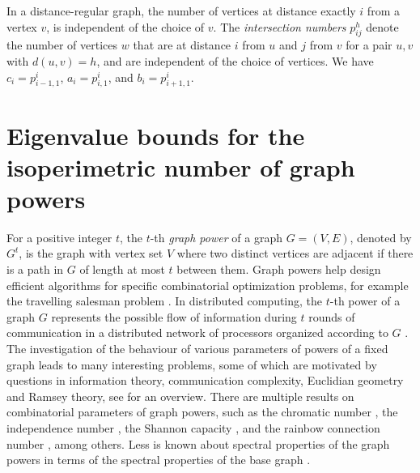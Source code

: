 \documentclass[a4paper,11pt]{article}
\theoremstyle{definition}
\begin{document}
In a distance-regular graph, %
the number of vertices at distance exactly $i$ from a vertex $v$, is independent of the choice of $v$. The \emph{intersection numbers} $p_{ij}^h$ denote the number of vertices $w$ that are at distance $i$ from $u$ and $j$ from $v$ for a pair $u,v$ with $d(u,v) = h$, and are independent of the choice of vertices. We have $c_i=p^i_{i-1,1}$, $a_i=p^i_{i,1}$, and $b_i=p^i_{i+1,1}$.


\section{Eigenvalue bounds for the isoperimetric number of graph powers}\label{sec:powers}


 
For a positive integer $t$, the $t$-th \emph{graph power} of a graph $G =(V, E)$, denoted by $G^t$, is the graph with vertex set $V$ where two distinct vertices are adjacent if there is a path in $G$ of length at most $t$ between them.
Graph powers help design efficient algorithms for specific combinatorial optimization problems, for example the travelling salesman problem
\cite{AB1995,BC2000}. In distributed computing, the $t$-th power of a graph $G$ represents the possible flow of information during $t$ rounds of communication in a distributed network of processors organized according to $G$ \cite{l92}.
The investigation of the behaviour of various parameters of powers of a fixed graph leads to many interesting problems, some of which are motivated by questions in information theory, communication complexity, Euclidian geometry and Ramsey theory, see \cite{Apowers,powersthesis} for an overview. There are multiple results on combinatorial parameters of graph powers, such as the chromatic number \cite{AM2002,H2009,KP2016}, the independence number \cite{ADFZ2023,acf2019}, the Shannon capacity \cite{ADF2025,AL2007v1}, and the rainbow connection number \cite{Basavaraju2014RainbowProducts}, among others. Less is known about spectral properties of the graph powers in terms of the spectral properties of the base graph  \cite{acfnz21,Das2013LaplacianGraph,JZ2017}.
\end{document}
